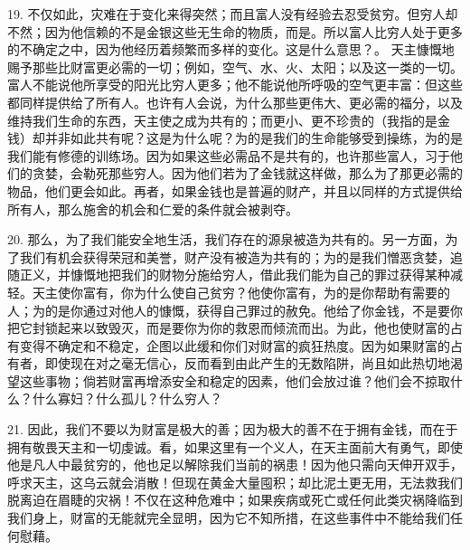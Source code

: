 19. 不仅如此，灾难在于变化来得突然；而且富人没有经验去忍受贫穷。但穷人却不然；因为他信赖的不是金银这些无生命的物质，而是。所以富人比穷人处于更多的不确定之中，因为他经历着频繁而多样的变化。这是什么意思？。 天主慷慨地赐予那些比财富更必需的一切；例如，空气、水、火、太阳；以及这一类的一切。富人不能说他所享受的阳光比穷人更多；他不能说他所呼吸的空气更丰富：但这些都同样提供给了所有人。也许有人会说，为什么那些更伟大、更必需的福分，以及维持我们生命的东西，天主使之成为共有的；而更小、更不珍贵的（我指的是金钱）却并非如此共有呢？这是为什么呢？为的是我们的生命能够受到操练，为的是我们能有修德的训练场。因为如果这些必需品不是共有的，也许那些富人，习于他们的贪婪，会勒死那些穷人。因为他们若为了金钱就这样做，那么为了那更必需的物品，他们更会如此。再者，如果金钱也是普遍的财产，并且以同样的方式提供给所有人，那么施舍的机会和仁爱的条件就会被剥夺。\par

20. 那么，为了我们能安全地生活，我们存在的源泉被造为共有的。另一方面，为了我们有机会获得荣冠和美誉，财产没有被造为共有的；为的是我们憎恶贪婪，追随正义，并慷慨地把我们的财物分施给穷人，借此我们能为自己的罪过获得某种减轻。天主使你富有，你为什么使自己贫穷？他使你富有，为的是你帮助有需要的人；为的是你通过对他人的慷慨，获得自己罪过的赦免。他给了你金钱，不是要你把它封锁起来以致毁灭，而是要你为你的救恩而倾流而出。为此，他也使财富的占有变得不确定和不稳定，企图以此缓和你们对财富的疯狂热度。因为如果财富的占有者，即使现在对之毫无信心，反而看到由此产生的无数陷阱，尚且如此热切地渴望这些事物；倘若财富再增添安全和稳定的因素，他们会放过谁？他们会不掠取什么？什么寡妇？什么孤儿？什么穷人？\par

21. 因此，我们不要以为财富是极大的善；因为极大的善不在于拥有金钱，而在于拥有敬畏天主和一切虔诚。看，如果这里有一个义人，在天主面前大有勇气，即使他是凡人中最贫穷的，他也足以解除我们当前的祸患！因为他只需向天伸开双手，呼求天主，这乌云就会消散！但现在黄金大量囤积；却比泥土更无用，无法救我们脱离迫在眉睫的灾祸！不仅在这种危难中；如果疾病或死亡或任何此类灾祸降临到我们身上，财富的无能就完全显明，因为它不知所措，在这些事件中不能给我们任何慰藉。\par

